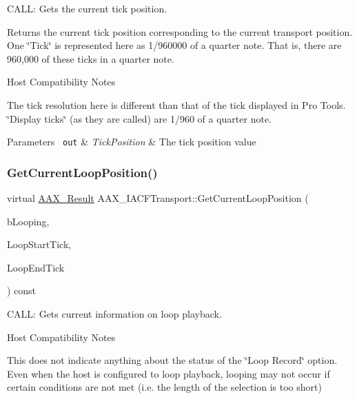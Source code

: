C\+A\+LL\+: Gets the current tick position. 

Returns the current tick position corresponding to the current transport position. One \char`\"{}\+Tick\char`\"{} is represented here as 1/960000 of a quarter note. That is, there are 960,000 of these ticks in a quarter note.

\begin{DoxyRefDesc}{Host Compatibility Notes}
\item[\mbox{\hyperlink{a00786__compatibility_notes000060}{Host Compatibility Notes}}]The tick resolution here is different than that of the tick displayed in Pro Tools. \char`\"{}\+Display ticks\char`\"{} (as they are called) are 1/960 of a quarter note.\end{DoxyRefDesc}



\begin{DoxyParams}[1]{Parameters}
\mbox{\texttt{ out}}  & {\em Tick\+Position} & The tick position value \\
\hline
\end{DoxyParams}
\mbox{\label{a01757_aa59e02326a236afc153637d54f4789be}} 
\subsubsection{\texorpdfstring{GetCurrentLoopPosition()}{GetCurrentLoopPosition()}}
{\footnotesize\ttfamily virtual \mbox{\hyperlink{a00392_a4d8f69a697df7f70c3a8e9b8ee130d2f}{A\+A\+X\+\_\+\+Result}} A\+A\+X\+\_\+\+I\+A\+C\+F\+Transport\+::\+Get\+Current\+Loop\+Position (\begin{DoxyParamCaption}\item[{bool $\ast$}]{b\+Looping,  }\item[{int64\+\_\+t $\ast$}]{Loop\+Start\+Tick,  }\item[{int64\+\_\+t $\ast$}]{Loop\+End\+Tick }\end{DoxyParamCaption}) const\hspace{0.3cm}{\ttfamily [pure virtual]}}



C\+A\+LL\+: Gets current information on loop playback. 

\begin{DoxyRefDesc}{Host Compatibility Notes}
\item[\mbox{\hyperlink{a00786__compatibility_notes000061}{Host Compatibility Notes}}]This does not indicate anything about the status of the \char`\"{}\+Loop Record\char`\"{} option. Even when the host is configured to loop playback, looping may not occur if certain conditions are not met (i.\+e. the length of the selection is too short)\end{DoxyRefDesc}



